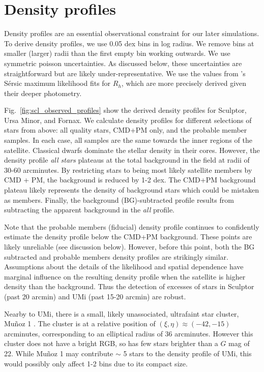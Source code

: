 \section{Density profiles}\label{density-profiles}

Density profiles are an essential observational constraint for our later
simulations. To derive density profiles, we use 0.05 dex bins in log
radius. We remove bins at smaller (larger) radii than the first empty
bin working outwards. We use symmetric poisson uncertainties. As
discussed below, these uncertainties are straightforward but are likely
under-representative. We use the values from \citet{munoz+2018}'s Sérsic
maximum likelihood fits for \(R_h\), which are more precisely derived
given their deeper photometry.

Fig.~\ref{fig:scl_observed_profiles} show the derived density profiles
for Sculptor, Ursa Minor, and Fornax. We calculate density profiles for
different selections of stars from above: all quality stars, CMD+PM
only, and the probable member samples. In each case, all samples are the
same towards the inner regions of the satellite. Classical dwarfs
dominate the stellar density in their cores. However, the density
profile \emph{all stars} plateaus at the total background in the field
at radii of 30-60 arcminutes. By restricting stars to being most likely
satellite members by CMD + PM, the background is reduced by 1-2 dex. The
CMD+PM background plateau likely represents the density of background
stars which could be mistaken as members. Finally, the background
(BG)-subtracted profile results from subtracting the apparent background
in the \emph{all} profile.

Note that the probable members (fiducial) density profile continues to
confidently estimate the density profile below the CMD+PM background.
These points are likely unreliable (see discussion below). However,
before this point, both the BG subtracted and probable members density
profiles are strikingly similar. Assumptions about the details of the
likelihood and spatial dependence have marginal influence on the
resulting density profile when the satellite is higher density than the
background. Thus the detection of excesses of stars in Sculptor (past 20
arcmin) and UMi (past 15-20 arcmin) are robust.

Nearby to UMi, there is a small, likely unassociated, ultrafaint star
cluster, Muñoz 1 \citep{munoz+2012}. The cluster is at a relative
position of \((\xi, \eta) \approx(-42, -15)\) arcminutes, corresponding
to an elliptical radius of 36 arcminutes. However this cluster does not
have a bright RGB, so has few stars brighter than a \(G\) mag of 22.
While Muñoz 1 may contribute \(\sim\) 5 stars to the density profile of
UMi, this would possibly only affect 1-2 bins due to its compact size.

